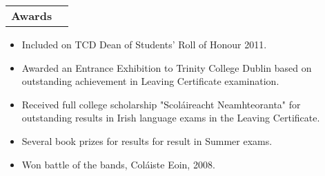 \documentclass[11pt]{article}
\makeatletter
\newenvironment{resumeSubSectionHeader}{
    \par
    \begin{tabular*}{\textwidth}{l@{\extracolsep{\fill}}r}
    \par
} {
    \end{tabular*}
    \par
}
\newenvironment{resumeSubSectionBody}{
    \par
    \vspace{-0.8\parskip}
    \begin{small}
    \par
} {
    \par
    \end{small}
    \par
}
\makeatother
\begin{document}
%
%
\begin{resumeSubSectionHeader}

    \textbf{Awards}

\end{resumeSubSectionHeader}
\begin{resumeSubSectionBody}

    \begin{itemize}
        \item
            Included on TCD Dean of Students' Roll of Honour 2011.

        \item
            Awarded an Entrance Exhibition to Trinity College Dublin
            based on outstanding achievement in Leaving Certificate
            examination.

        \item
            Received full college scholarship "Scol\'aireacht Neamhteoranta"
            for outstanding results in Irish language exams in the
            Leaving Certificate.

        \item
            Several book prizes for results for result in Summer exams.

        \item
            Won battle of the bands, Col\'aiste Eoin, 2008.
    \end{itemize}

\end{resumeSubSectionBody}
\end{document}

